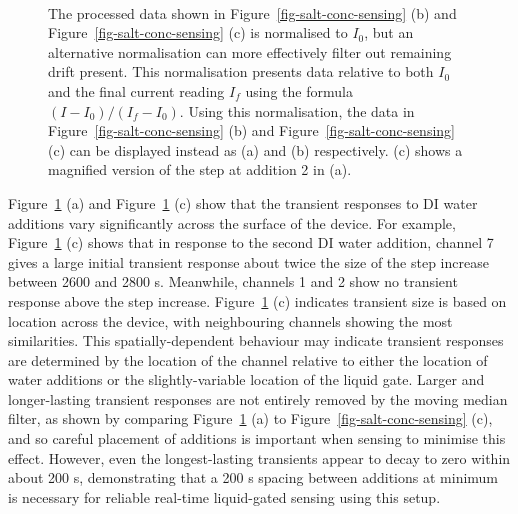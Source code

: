 \documentclass[
  a4paper,
]{scrbook}
\begin{document}
\begin{figure}
\begin{minipage}[t]{0.70\linewidth}
{{}

}

\end{minipage}%
%
\begin{minipage}[t]{0.15\linewidth}

{\centering 

~

}

\end{minipage}%

\caption[Salt concentration sensing series presented using an
alternative normalisation approach.]{\label{fig-salt-conc-sensing-2}The
processed data shown in Figure~\ref{fig-salt-conc-sensing} (b) and
Figure~\ref{fig-salt-conc-sensing} (c) is normalised to \(I_{0}\), but
an alternative normalisation can more effectively filter out remaining
drift present. This normalisation presents data relative to both
\(I_{0}\) and the final current reading \(I_{f}\) using the formula
\((I - I_0)/(I_f - I_0)\). Using this normalisation, the data in
Figure~\ref{fig-salt-conc-sensing} (b) and
Figure~\ref{fig-salt-conc-sensing} (c) can be displayed instead as (a)
and (b) respectively. (c) shows a magnified version of the step at
addition 2 in (a).}

\end{figure}

Figure~\ref{fig-salt-conc-sensing-2} (a) and
Figure~\ref{fig-salt-conc-sensing-2} (c) show that the transient
responses to DI water additions vary significantly across the surface of
the device. For example, Figure~\ref{fig-salt-conc-sensing-2} (c) shows
that in response to the second DI water addition, channel 7 gives a
large initial transient response about twice the size of the step
increase between 2600 and 2800 s. Meanwhile, channels 1 and 2 show no
transient response above the step increase.
Figure~\ref{fig-salt-conc-sensing-2} (c) indicates transient size is
based on location across the device, with neighbouring channels showing
the most similarities. This spatially-dependent behaviour may indicate
transient responses are determined by the location of the channel
relative to either the location of water additions or the
slightly-variable location of the liquid gate. Larger and longer-lasting
transient responses are not entirely removed by the moving median
filter, as shown by comparing Figure~\ref{fig-salt-conc-sensing-2} (a)
to Figure~\ref{fig-salt-conc-sensing} (c), and so careful placement of
additions is important when sensing to minimise this effect. However,
even the longest-lasting transients appear to decay to zero within about
200 s, demonstrating that a 200 s spacing between additions at minimum
is necessary for reliable real-time liquid-gated sensing using this
setup.
\end{document}
